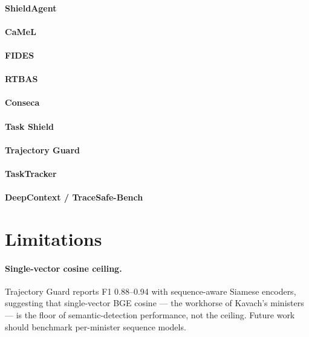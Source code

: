 \documentclass[11pt]{article}
\begin{document}
\paragraph{ShieldAgent} \cite{chen2025shieldagent}
\paragraph{CaMeL} \cite{}
\paragraph{FIDES} \cite{}
\paragraph{RTBAS} \cite{}
\paragraph{Conseca} \cite{}
\paragraph{Task Shield} \cite{}
\paragraph{Trajectory Guard} \cite{}
\paragraph{TaskTracker} \cite{abdelnabi2024tasktracker}
\paragraph{DeepContext / TraceSafe-Bench}

\section{Limitations}
\label{sec:limitations}

\paragraph{Single-vector cosine ceiling.} Trajectory Guard
\cite{abdelnabi2026trajectoryguard} reports F1 0.88--0.94 with sequence-aware
Siamese encoders, suggesting that single-vector BGE cosine — the workhorse
of Kavach's ministers — is the floor of semantic-detection performance, not
the ceiling. Future work should benchmark per-minister sequence models.
\end{document}
